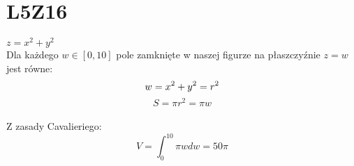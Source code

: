\documentclass{article}
\title{}
\date{20.10.2020}
\author{Maurycy Borkowski}
\begin{document}
\maketitle

\section{L5Z16}
$z = x^2 + y^2$\\
Dla każdego $w \in [0,10]$ pole zamknięte w naszej figurze na płaszczyźnie $z = w$ jest równe:
$$
w = x^2 + y^2 = r^2\\
$$
$$
S = \pi r^2 = \pi w
$$
\\Z zasady Cavalieriego:
$$
V = \int_0^{10} \pi w dw = 50 \pi
$$
\end{document}
